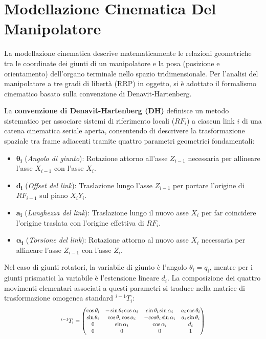 \documentclass[11pt, a4paper]{report}
\begin{document}


\chapter{Modellazione Cinematica Del Manipolatore}
\label{chap:modellazione_cinematica}

La modellazione cinematica descrive matematicamente le relazioni geometriche tra le coordinate dei giunti di un manipolatore e la posa (posizione e orientamento) dell'organo terminale nello spazio tridimensionale. Per l'analisi del manipolatore a tre gradi di libertà (RRP) in oggetto, si è adottato il formalismo cinematico basato sulla convenzione di Denavit-Hartenberg.

La \textbf{convenzione di Denavit-Hartenberg (DH)} definisce un metodo sistematico per associare sistemi di riferimento locali (\(RF_i\)) a ciascun link \(i\) di una catena cinematica seriale aperta, consentendo di descrivere la trasformazione spaziale tra frame adiacenti tramite quattro parametri geometrici fondamentali:
\begin{itemize}
    \item \(\bm{\theta_i}\) (\textit{Angolo di giunto}): Rotazione attorno all'asse \(Z_{i-1}\) necessaria per allineare l'asse \(X_{i-1}\) con l'asse \(X_i\).
    \item \(\bm{d_i}\) (\textit{Offset del link}): Traslazione lungo l'asse \(Z_{i-1}\) per portare l'origine di \(RF_{i-1}\) sul piano \(X_i Y_i\).
    \item \(\bm{a_i}\) (\textit{Lunghezza del link}): Traslazione lungo il nuovo asse \(X_i\) per far coincidere l'origine traslata con l'origine effettiva di \(RF_i\).
    \item \(\bm{\alpha_i}\) (\textit{Torsione del link}): Rotazione attorno al nuovo asse \(X_i\) necessaria per allineare l'asse \(Z_{i-1}\) con l'asse \(Z_i\).
\end{itemize}

Nel caso di giunti rotatori, la variabile di giunto è l'angolo \(\theta_i = q_i\), mentre per i giunti prismatici la variabile è l'estensione lineare \(d_i\). La composizione dei quattro movimenti elementari associati a questi parametri si traduce nella matrice di trasformazione omogenea standard \(^{i-1}T_i\):
\[
\scalebox{0.8}{$
    ^{i-1}T_i =
    \begin{pmatrix}
        \cos\theta_i & -\sin\theta_i\cos\alpha_i & \sin\theta_i\sin\alpha_i & a_i\cos\theta_i \\
        \sin\theta_i & \cos\theta_i\cos\alpha_i & -cos\theta_i\sin\alpha_i & a_i\sin\theta_i \\
        0 & \sin\alpha_i & \cos\alpha_i & d_i \\
        0 & 0 & 0 & 1
    \end{pmatrix}
$}
\]
\end{document}
